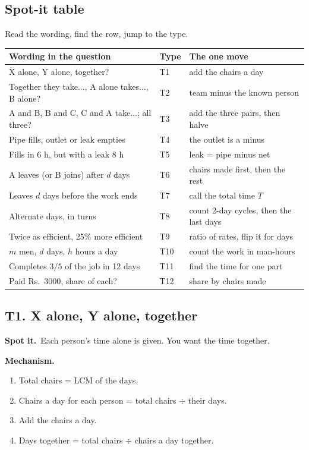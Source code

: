 \documentclass[11pt,a4paper]{article}
\let\oldsubsection\subsection
\renewcommand{\subsection}{\needspace{9\baselineskip}\oldsubsection}
\newcommand{\spot}{\textbf{\color{ember}Spot it.}\ }
\newcommand{\mech}{\textbf{\color{ember}Mechanism.}\ }
\begin{document}
\subsection*{Spot-it table}
Read the wording, find the row, jump to the type.
\begin{center}\small\renewcommand{\arraystretch}{1.18}\setlength{\tabcolsep}{7pt}
\begin{tabularx}{\linewidth}{@{}>{\raggedright\arraybackslash}X l >{\raggedright\arraybackslash}X@{}}
\toprule
\textbf{\color{slate}Wording in the question} & \textbf{\color{slate}Type} & \textbf{\color{slate}The one move} \\ \midrule
X alone, Y alone, together? & T1 & add the chairs a day \\
Together they take..., A alone takes..., B alone? & T2 & team minus the known person \\
A and B, B and C, C and A take...; all three? & T3 & add the three pairs, then halve \\
Pipe fills, outlet or leak empties & T4 & the outlet is a minus \\
Fills in 6 h, but with a leak 8 h & T5 & leak = pipe minus net \\
A leaves (or B joins) after $d$ days & T6 & chairs made first, then the rest \\
Leaves $d$ days before the work ends & T7 & call the total time $T$ \\
Alternate days, in turns & T8 & count 2-day cycles, then the last days \\
Twice as efficient, 25\% more efficient & T9 & ratio of rates, flip it for days \\
$m$ men, $d$ days, $h$ hours a day & T10 & count the work in man-hours \\
Completes $3/5$ of the job in 12 days & T11 & find the time for one part \\
Paid Rs.\ 3000, share of each? & T12 & share by chairs made \\
\bottomrule
\end{tabularx}\end{center}

\subsection{T1. X alone, Y alone, together}
\spot Each person's time alone is given. You want the time together.

\mech
\begin{enumerate}
\item Total chairs = LCM of the days.
\item Chairs a day for each person = total chairs $\div$ their days.
\item Add the chairs a day.
\item Days together = total chairs $\div$ chairs a day together.
\end{enumerate}
\end{document}
